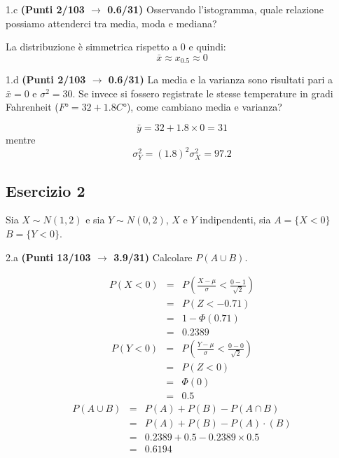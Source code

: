 \documentclass[
  11pt,
]{book}
\theoremstyle{mytheoremstyle}
\theoremstyle{mydefstyle}
\newenvironment{sol}
  {
  \begin{tcolorbox}[enhanced,breakable,arc=0.1mm,boxrule=1pt,colback=white,colframe=iblue,
  title=\bf \fontfamily{lmss}\selectfont \hspace{.5 cm} Soluzione,drop fuzzy shadow]

}{
\end{tcolorbox}
  }
\begin{document}
1.c \textbf{(Punti 2/103 \(\rightarrow\) 0.6/31)} Osservando l'istogramma, quale relazione possiamo attenderci tra media, moda e mediana?

\begin{sol}
La distribuzione è simmetrica rispetto a 0 e quindi:
\[
\bar x \approx x_{0.5} \approx 0
\]

\end{sol}

1.d \textbf{(Punti 2/103 \(\rightarrow\) 0.6/31)} La media e la varianza sono risultati pari a \(\bar x = 0\) e \(\sigma^2 =30\). Se invece si fossero registrate le stesse temperature in gradi Fahrenheit (\(F° = 32 + 1.8 C°\)), come cambiano media e varianza?

\begin{sol}
\[
\bar y = 32+1.8 \times 0 = 31
\]
mentre
\[
\sigma_Y^2 = (1.8)^2\sigma_X^2 = 97.2
\]

\end{sol}

\subsection{Esercizio 2}\label{esercizio-2-48}

Sia \(X\sim N(1,2)\) e sia \(Y\sim N(0,2)\), \(X\) e \(Y\) indipendenti, sia \(A=\{X<0\}\) \(B=\{Y<0\}\).

2.a \textbf{(Punti 13/103 \(\rightarrow\) 3.9/31)} Calcolare \(P(A\cup B)\).

\begin{sol}
\begin{eqnarray*}
      P( X   <   0 ) 
        &=& P\left(  \frac { X  -  \mu }{ \sigma }  <  \frac { 0  -  1 }{\sqrt{ 2 }} \right)  \\
                 &=& P\left(  Z   <   -0.71 \right) \\    
                 &=&  1-\Phi( 0.71 ) \\ &=&  0.2389 
      \end{eqnarray*}\begin{eqnarray*}
      P( Y   <   0 ) 
        &=& P\left(  \frac { Y  -  \mu }{ \sigma }  <  \frac { 0  -  0 }{\sqrt{ 2 }} \right)  \\
                 &=& P\left(  Z   <   0 \right) \\    
                 &=&  \Phi( 0 ) \\ &=&  0.5 
      \end{eqnarray*}\begin{eqnarray}
      P( A \cup B ) &=& P( A )+P( B )-P( A \cap B ) \\
                         &=& P( A )+P( B )-P( A )\cdot ( B ) \\
                         &=&  0.2389 + 0.5 - 0.2389 \times 0.5  \\
                         &=&  0.6194 \end{eqnarray}

\end{sol}
\end{document}
